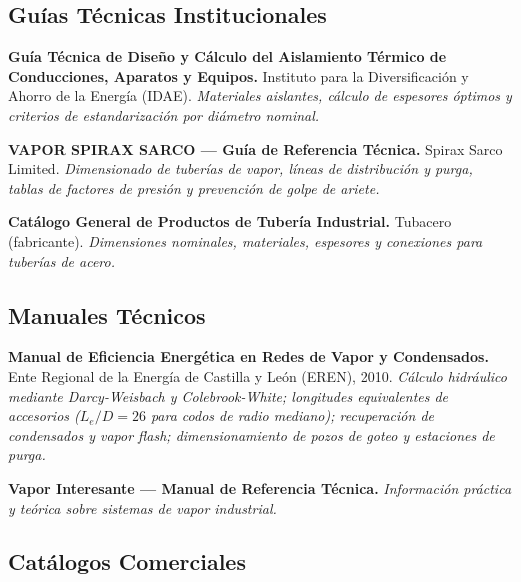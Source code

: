 \subsection*{Guías Técnicas Institucionales}

\begin{enumerate}[label={[\arabic*]}, leftmargin=2em, resume]
	\item \textbf{Guía Técnica de Diseño y Cálculo del Aislamiento Térmico de Conducciones, Aparatos y Equipos.}
	      Instituto para la Diversificación y Ahorro de la Energía (IDAE).
	      \textit{Materiales aislantes, cálculo de espesores óptimos y criterios de estandarización por diámetro nominal.}

	\item \textbf{VAPOR SPIRAX SARCO --- Guía de Referencia Técnica.}
	      Spirax Sarco Limited.
	      \textit{Dimensionado de tuberías de vapor, líneas de distribución y purga, tablas de factores de presión y prevención de golpe de ariete.}

	\item \textbf{Catálogo General de Productos de Tubería Industrial.}
	      Tubacero (fabricante).
	      \textit{Dimensiones nominales, materiales, espesores y conexiones para tuberías de acero.}
\end{enumerate}

\subsection*{Manuales Técnicos}

\begin{enumerate}[label={[\arabic*]}, leftmargin=2em, resume]
	\item \textbf{Manual de Eficiencia Energética en Redes de Vapor y Condensados.}
	      Ente Regional de la Energía de Castilla y León (EREN), 2010.
	      \textit{Cálculo hidráulico mediante Darcy-Weisbach y Colebrook-White; longitudes equivalentes de accesorios ($L_e/D = 26$ para codos de radio mediano); recuperación de condensados y vapor flash; dimensionamiento de pozos de goteo y estaciones de purga.}

	\item \textbf{Vapor Interesante --- Manual de Referencia Técnica.}
	      \textit{Información práctica y teórica sobre sistemas de vapor industrial.}
\end{enumerate}

\subsection*{Catálogos Comerciales}

